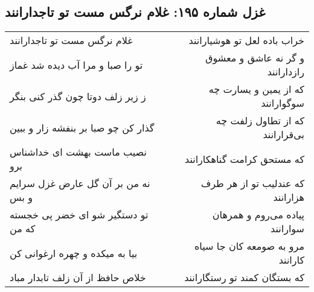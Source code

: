 \begin{center}
\section*{غزل شماره ۱۹۵: غلام نرگس مست تو تاجدارانند}
\label{sec:sh195}
\begin{longtable}{l p{0.5cm} r}
غلام نرگس مست تو تاجدارانند
&&
خراب باده لعل تو هوشیارانند
\\
تو را صبا و مرا آب دیده شد غماز
&&
و گر نه عاشق و معشوق رازدارانند
\\
ز زیر زلف دوتا چون گذر کنی بنگر
&&
که از یمین و یسارت چه سوگوارانند
\\
گذار کن چو صبا بر بنفشه زار و ببین
&&
که از تطاول زلفت چه بی‌قرارانند
\\
نصیب ماست بهشت ای خداشناس برو
&&
که مستحق کرامت گناهکارانند
\\
نه من بر آن گل عارض غزل سرایم و بس
&&
که عندلیب تو از هر طرف هزارانند
\\
تو دستگیر شو ای خضر پی خجسته که من
&&
پیاده می‌روم و همرهان سوارانند
\\
بیا به میکده و چهره ارغوانی کن
&&
مرو به صومعه کان جا سیاه کارانند
\\
خلاص حافظ از آن زلف تابدار مباد
&&
که بستگان کمند تو رستگارانند
\\
\end{longtable}
\end{center}
